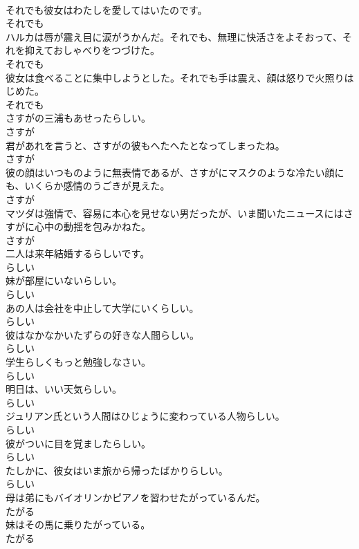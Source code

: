 \documentclass[8pt]{extreport}
\begin{document}
\begin{CJK}{UTF8}{min}
\\	それでも彼女はわたしを愛してはいたのです。	
\\	それでも
\\	ハルカは唇が震え目に涙がうかんだ。それでも、無理に快活さをよそおって、それを抑えておしゃべりをつづけた。	
\\	それでも
\\	彼女は食べることに集中しようとした。それでも手は震え、顔は怒りで火照りはじめた。	
\\	それでも
\\	さすがの三浦もあせったらしい。	
\\	さすが
\\	君があれを言うと、さすがの彼もへたへたとなってしまったね。	
\\	さすが
\\	彼の顔はいつものように無表情であるが、さすがにマスクのような冷たい顔にも、いくらか感情のうごきが見えた。	
\\	さすが
\\	マツダは強情で、容易に本心を見せない男だったが、いま聞いたニュースにはさすがに心中の動揺を包みかねた。	
\\	さすが
\\	二人は来年結婚するらしいです。	
\\	らしい
\\	妹が部屋にいないらしい。	
\\	らしい
\\	あの人は会社を中止して大学にいくらしい。	
\\	らしい
\\	彼はなかなかいたずらの好きな人間らしい。	
\\	らしい
\\	学生らしくもっと勉強しなさい。	
\\	らしい
\\	明日は、いい天気らしい。	
\\	らしい
\\	ジュリアン氏という人間はひじょうに変わっている人物らしい。	
\\	らしい
\\	彼がついに目を覚ましたらしい。	
\\	らしい
\\	たしかに、彼女はいま旅から帰ったばかりらしい。	
\\	らしい
\\	母は弟にもバイオリンかピアノを習わせたがっているんだ。	
\\	たがる
\\	妹はその馬に乗りたがっている。	
\\	たがる

\end{CJK}
\end{document}
